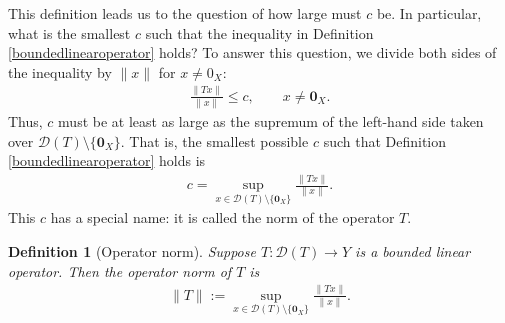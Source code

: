 \documentclass[11pt]{article}
\theoremstyle{mystyle}
\newtheorem{defn}{Definition}[section]
\newcommand{\0}{\mathbf{0}}
\begin{document}
This definition leads us to the question of how large must $c$ be. In particular, what is the smallest $c$ such that the inequality in Definition \ref{boundedlinearoperator} holds? To answer this question, we divide both sides of the inequality by $\|x\|$ for $x \neq 0_X$:
\begin{align*}
    \frac{\|Tx\|}{\|x\|} \leq c, \qquad x \neq \0_X.
\end{align*}
Thus, $c$ must be at least as large as the supremum of the left-hand side taken over $\mathscr{D}(T)\setminus\{\0_X\}$. That is, the smallest possible $c$ such that Definition \ref{boundedlinearoperator} holds is 
\begin{align*}
c = \sup_{x \in \mathscr{D}(T)\setminus\{\0_X\}}\frac{\|Tx\|}{\|x\|}.
\end{align*}
This $c$ has a special name: it is called the norm of the operator $T$.

\begin{defn}[Operator norm]\label{operatornorm}
Suppose $T: \mathscr{D}(T) \longrightarrow Y$ is a bounded linear operator. Then the operator norm of $T$ is
\begin{align*}
    \|T\| := \sup_{x \in \mathscr{D}(T)\setminus\{\0_X\}} \frac{\|Tx\|}{\|x\|}.
\end{align*}
\end{defn}
\end{document}
